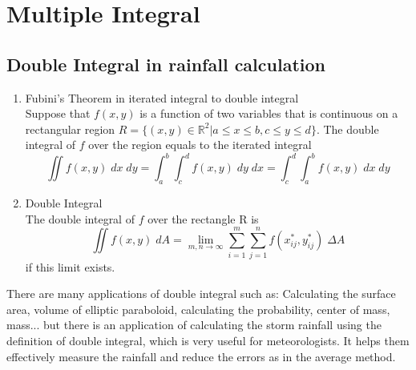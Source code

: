 \documentclass[a4paper]{article}
\begin{document}
	\section{Multiple Integral}
	\subsection{Double Integral in rainfall calculation}
	\begin{enumerate}[label=\textbf{$\alph*.$}]
		\item Fubini's Theorem\cite{anton2010calculus} in iterated integral to double integral \\
		Suppose that $f(x,y)$ is a function of two variables that is continuous on a rectangular region $R=\{(x,y)\in \mathbb{R}^2|a\leq x\leq b, c\leq y\leq d\}$. The double integral of $f$ over the region equals to the iterated integral
		\begin{equation*}
		\iint f(x,y)\;dx\;dy = \int_a^b \int_c^d f(x,y)\;dy\;dx = \int_c^d \int_a^b f(x,y)\;dx\;dy
		\end{equation*}
		
		\item Double Integral \\
		The double integral of $f$ over the rectangle R is
		\begin{equation*}
		\iint f(x,y)\;dA = \lim_{m,n \rightarrow \infty} \sum_{i=1}^{m} \sum_{j=1}^{n} f(x_{ij}^{*}, y_{ij}^{*})\; \Delta A
		\end{equation*}
		if this limit exists.
	\end{enumerate}
	There are many applications of double integral such as: Calculating the surface area, volume of elliptic paraboloid, calculating the probability, center of mass, mass... but there is an application of calculating the storm rainfall using the definition of double integral, which is very useful for meteorologists. It helps them effectively measure the rainfall and reduce the errors as in the average method.
	
\end{document}
